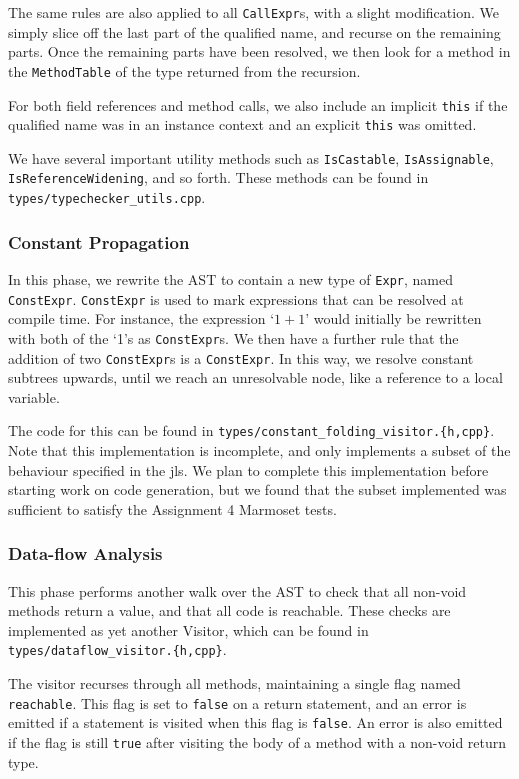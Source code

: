 \documentclass[12pt, titlepage]{article}
\newcommand{\z}[1]{\texttt{#1}}
\begin{document}
The same rules are also applied to all \z{CallExpr}s, with a slight modification.
We simply slice off the last part of the qualified name, and recurse on the
remaining parts. Once the remaining parts have been resolved, we then look for
a method in the \z{MethodTable} of the type returned from the recursion.

For both field references and method calls, we also include an implicit \z{this}
if the qualified name was in an instance context and an explicit \z{this} was
omitted.

We have several important utility methods such as \z{IsCastable},
\z{IsAssignable}, \z{IsReferenceWidening}, and so forth. These methods can be
found in \z{types/typechecker\_utils.cpp}.

\subsubsection{Constant Propagation}\label{subsubsec:const-prop}

In this phase, we rewrite the AST to contain a new type of \z{Expr}, named
\z{ConstExpr}. \z{ConstExpr} is used to mark expressions that can be resolved
at compile time. For instance, the expression `$1 + 1$' would initially be
rewritten with both of the `1's as \z{ConstExpr}s. We then have a further rule
that the addition of two \z{ConstExpr}s is a \z{ConstExpr}. In this way, we
resolve constant subtrees upwards, until we reach an unresolvable node, like a
reference to a local variable.

The code for this can be found in
\z{types/constant\_folding\_visitor.\{h,cpp\}}.  Note that this implementation
is incomplete, and only implements a subset of the behaviour specified in the
\ac{jls}. We plan to complete this implementation before starting work on code
generation, but we found that the subset implemented was sufficient to satisfy
the Assignment 4 Marmoset tests.

\subsubsection{Data-flow Analysis}\label{subsubsec:data-flow}

This phase performs another walk over the AST to check that all non-void
methods return a value, and that all code is reachable. These checks are
implemented as yet another Visitor, which can be found in
\z{types/dataflow\_visitor.\{h,cpp\}}.

The visitor recurses through all methods, maintaining a single flag named
\z{reachable}. This flag is set to \z{false} on a return statement, and an error is
emitted if a statement is visited when this flag is \z{false}. An error is also
emitted if the flag is still \z{true} after visiting the body of a method with
a non-void return type.
\end{document}
